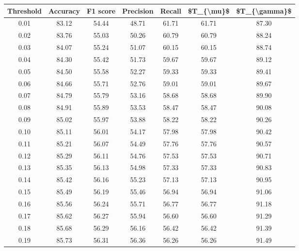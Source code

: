 \begin{tabular}{|c|c|c|c|c|c|c|}
\toprule
 Threshold &  Accuracy &  F1 score &  Precision &  Recall &  \$T\_\{\textbackslash mu\}\$ &  \$T\_\{\textbackslash gamma\}\$ \\
\hline
      0.01 &     83.12 &     54.44 &      48.71 &   61.71 &      61.71 &         87.30 \\
      0.02 &     83.76 &     55.03 &      50.26 &   60.79 &      60.79 &         88.24 \\
      0.03 &     84.07 &     55.24 &      51.07 &   60.15 &      60.15 &         88.74 \\
      0.04 &     84.30 &     55.42 &      51.73 &   59.67 &      59.67 &         89.12 \\
      0.05 &     84.50 &     55.58 &      52.27 &   59.33 &      59.33 &         89.41 \\
      0.06 &     84.66 &     55.71 &      52.76 &   59.01 &      59.01 &         89.67 \\
      0.07 &     84.79 &     55.79 &      53.16 &   58.68 &      58.68 &         89.90 \\
      0.08 &     84.91 &     55.89 &      53.53 &   58.47 &      58.47 &         90.08 \\
      0.09 &     85.02 &     55.97 &      53.88 &   58.22 &      58.22 &         90.26 \\
      0.10 &     85.11 &     56.01 &      54.17 &   57.98 &      57.98 &         90.42 \\
      0.11 &     85.21 &     56.07 &      54.49 &   57.76 &      57.76 &         90.57 \\
      0.12 &     85.29 &     56.11 &      54.76 &   57.53 &      57.53 &         90.71 \\
      0.13 &     85.35 &     56.13 &      54.98 &   57.33 &      57.33 &         90.83 \\
      0.14 &     85.42 &     56.16 &      55.23 &   57.13 &      57.13 &         90.95 \\
      0.15 &     85.49 &     56.19 &      55.46 &   56.94 &      56.94 &         91.06 \\
      0.16 &     85.56 &     56.24 &      55.71 &   56.77 &      56.77 &         91.18 \\
      0.17 &     85.62 &     56.27 &      55.94 &   56.60 &      56.60 &         91.29 \\
      0.18 &     85.68 &     56.29 &      56.16 &   56.42 &      56.42 &         91.39 \\
      0.19 &     85.73 &     56.31 &      56.36 &   56.26 &      56.26 &         91.49 \\

\end{tabular}
